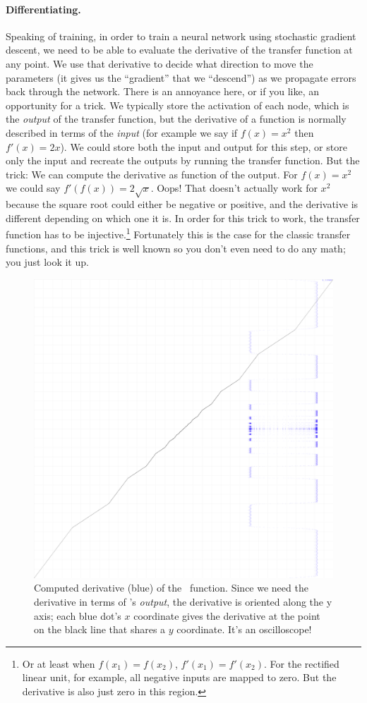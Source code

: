 \documentclass[twocolumn]{article}
\begin{document}
\paragraph{Differentiating.}
Speaking of training, in order to train a neural network using
stochastic gradient descent, we need to be able to evaluate the
derivative of the transfer function at any point. We use that
derivative to decide what direction to move the parameters (it gives
us the ``gradient'' that we ``descend'') as we propagate errors back
through the network. There is an annoyance here, or if you like, an
opportunity for a trick. We typically store the activation of each
node, which is the {\em output} of the transfer function, but the
derivative of a function is normally described in terms of the {\em
  input} (for example we say if $f(x) = x^2$ then $f'(x) = 2x$). We
could store both the input and output for this step, or store only the
input and recreate the outputs by running the transfer function. But
the trick: We can compute the derivative as function of the output.
For $f(x) = x^2$ we could say $f'(f(x)) = 2\sqrt{x}$. Oops! That
doesn't actually work for $x^2$ because the square root could
either be negative or positive, and the derivative is different
depending on which one it is. In order for this trick to work,
the transfer function has to be injective.\footnote{Or at least
  when $f(x_1) = f(x_2)$, $f'(x_1) = f'(x_2)$. For the rectified
  linear unit, for example, all negative inputs are mapped to zero.
  But the derivative is also just zero in this region.}
Fortunately this is the case for the classic transfer functions,
and this trick is well known so you don't even need to do any math;
you just look it up.

\begin{figure}
  \begin{center}
    \includegraphics[width=0.65 \linewidth]{grad1oscilloscope}
  \end{center}
  \caption{
    Computed derivative (blue) of the \gradone\ function. Since we need
    the derivative in terms of \gradone's {\em output}, the
    derivative is oriented along the y axis; each blue dot's $x$ coordinate
    gives the derivative at the point on the black line that shares a $y$
    coordinate. It's an oscilloscope!
  } \label{fig:grad1oscilloscope}
\end{figure}
\end{document}
